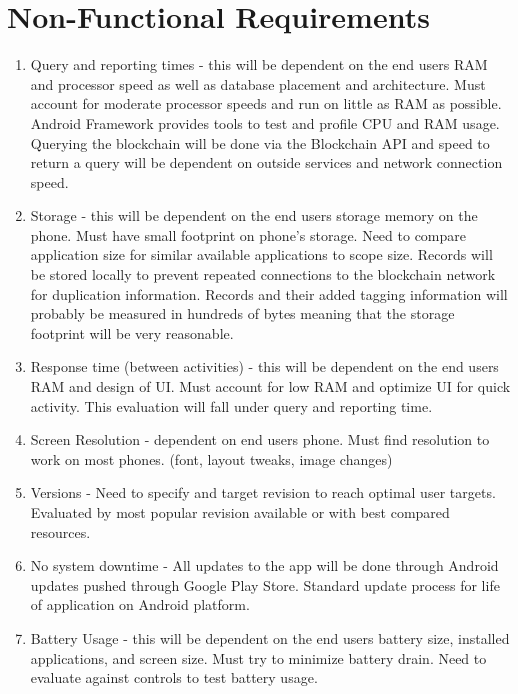 \section{Non-Functional Requirements}


\begin{enumerate}[label=4.\arabic*] 

\item Query and reporting times - this will be dependent on the end users RAM and processor speed as well as database placement and architecture. Must account for moderate processor speeds and run on little as RAM as possible. Android Framework provides tools to test and profile CPU and RAM usage. Querying the blockchain will be done via the Blockchain API and speed to return a query will be dependent on outside services and network connection speed.

\item Storage - this will be dependent on the end users storage memory on the phone. Must have small footprint on phone’s storage. Need to compare application size for similar available applications to scope size. Records will be stored locally to prevent repeated connections to the blockchain network for duplication information. Records and their added tagging information will probably be measured in hundreds of bytes meaning that the storage footprint will be very reasonable.

\item Response time (between activities) - this will be dependent on the end users RAM and design of UI.  Must account for low RAM and optimize UI for quick activity. This evaluation will fall under query and reporting time. 

\item Screen Resolution - dependent on end users phone. Must find resolution to work on most phones. (font, layout tweaks, image changes)

\item Versions - Need to specify and target revision to reach optimal user targets. Evaluated by most popular revision available or with best compared resources. 

\item No system downtime - All updates to the app will be done through Android updates pushed through Google Play Store. Standard update process for life of application on Android platform. 

\item Battery Usage - this will be dependent on the end users battery size, installed applications, and screen size. Must try to minimize battery drain. Need to evaluate against controls to test battery usage. 
\end{enumerate}
